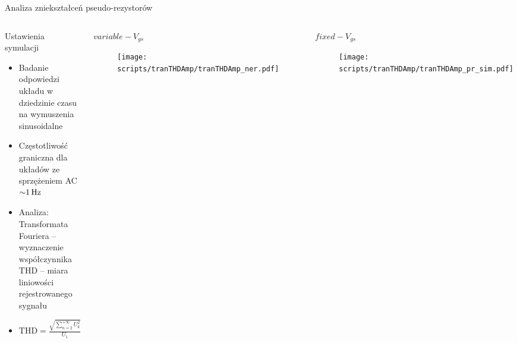 \begin{frame}{Analiza zniekształceń pseudo-rezystorów}
    \vspace{-1em}
    \begin{columns}
        \begin{block}{Ustawienia symulacji}
            \begin{itemize}
                \item Badanie odpowiedzi układu  w dziedzinie czasu na wymuszenia sinusoidalne
                \item Częstotliwość graniczna dla układów ze sprzężeniem AC $\SI{\sim 1}{\hertz}$
                \item Analiza: Transformata Fouriera -- wyznaczenie współczynnika THD -- miara liniowości rejestrowanego sygnału
                \item $\mathrm{THD} = \frac{\sqrt{\sum_{n=2}^{+\infty} U_k^2}}{U_1}$
            \end{itemize}
                \end{block}
        \vspace{-1em} %
        \begin{alertblock}{$variable-V_{gs}$}
        \begin{figure}[H]
            \centering
            \texttt{[image: scripts/tranTHDAmp/tranTHDAmp\_ner.pdf]}
        \end{figure}
    \end{alertblock}
        \vspace{-1em} %
        \begin{exampleblock}{$fixed-V_{gs}$}
        \begin{figure}[H]
            \centering
            \texttt{[image: scripts/tranTHDAmp/tranTHDAmp\_pr\_sim.pdf]}
        \end{figure}
    \end{exampleblock}
    \end{columns}

\end{frame}




